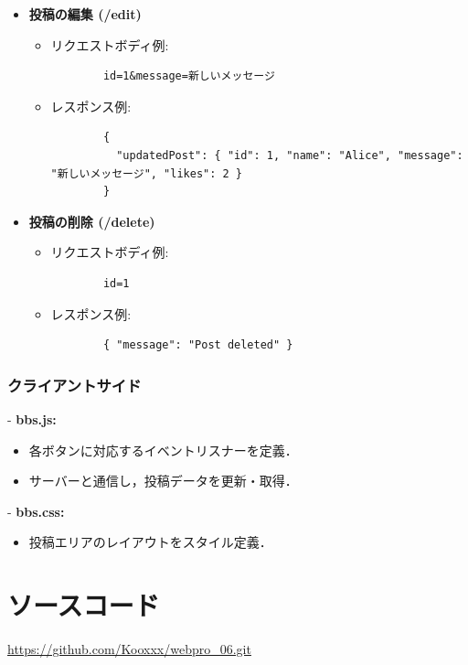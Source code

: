 \documentclass[uplatex,dvipdfmx]{jsarticle}
\begin{document}
\begin{itemize}
  \item \textbf{投稿の編集 (/edit)}
    \begin{itemize}
      \item リクエストボディ例:
        \begin{verbatim}
        id=1&message=新しいメッセージ
        \end{verbatim}
      \item レスポンス例:
        \begin{verbatim}
        {
          "updatedPost": { "id": 1, "name": "Alice", "message": "新しいメッセージ", "likes": 2 }
        }
        \end{verbatim}
    \end{itemize}

  \item \textbf{投稿の削除 (/delete)}
    \begin{itemize}
      \item リクエストボディ例:
        \begin{verbatim}
        id=1
        \end{verbatim}
      \item レスポンス例:
        \begin{verbatim}
        { "message": "Post deleted" }
        \end{verbatim}
    \end{itemize}
\end{itemize}

\subsubsection*{クライアントサイド}
- \textbf{bbs.js:}
  \begin{itemize}
    \item 各ボタンに対応するイベントリスナーを定義．
    \item サーバーと通信し，投稿データを更新・取得．
  \end{itemize}

- \textbf{bbs.css:}
  \begin{itemize}
    \item 投稿エリアのレイアウトをスタイル定義．
  \end{itemize}

\section{ソースコード}
\url{https://github.com/Kooxxx/webpro_06.git}
\end{document}
